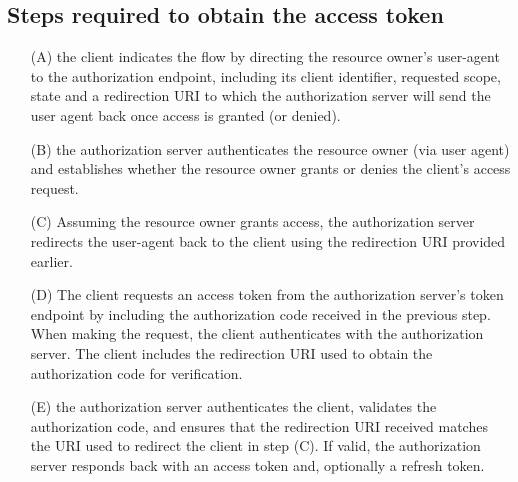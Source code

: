 \documentclass[11pt]{style}
\begin{document}
\subsection{Steps required to obtain the access token}
\begin{enumerate}
    \item[(A)] the client indicates the flow by directing the resource owner's
        user-agent to the authorization endpoint, including its client
        identifier, requested scope, state and a redirection URI to which the
        authorization server will send the user agent back once access is
        granted (or denied).
    \item[(B)] the authorization server authenticates the resource owner (via
        user agent) and establishes whether the resource owner grants or denies
        the client's access request.
    \item[(C)] Assuming the resource owner grants access, the authorization
        server redirects the user-agent back to the client using the redirection
        URI provided earlier.
    \item[(D)] The client requests an access token from the authorization
        server's token endpoint by including the authorization code
        received in the previous step.  When making the request, the
        client authenticates with the authorization server.  The client
        includes the redirection URI used to obtain the authorization
        code for verification.
    \item[(E)] the authorization server authenticates the client, validates the
        authorization code, and ensures that the redirection URI received
        matches the URI used to redirect the client in step (C). If valid, the
        authorization server responds back with an access token and,
        optionally a refresh token.
\end{enumerate}
\end{document}
